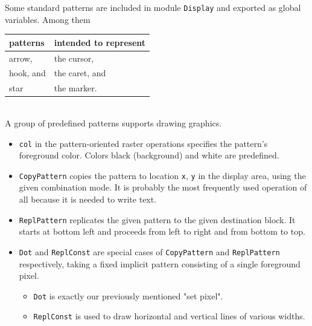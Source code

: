 Some standard patterns are included in module \verb|Display| and exported as global variables.
Among them
\begin{table}[h!]
  \centering
  \begin{tabular}{l l}
    patterns  & intended to represent \\\hline
    arrow,    & the cursor, \\
    hook, and & the caret, and \\
    star      & the marker.
  \end{tabular}
\end{table}
\\A group of predefined patterns supports drawing graphics.
\begin{itemize}
  \item \verb|col| in the pattern-oriented raster operations specifies the pattern's foreground color.
    Colors black (background) and white are predefined.
  \item \verb|CopyPattern| copies the pattern to location \verb|x|, \verb|y| in the display area,
    using the given combination mode.
    It is probably the most frequently used operation of all because it is needed to write text.
  \item \verb|ReplPattern| replicates the given pattern to the given destination block.
    It starts at bottom left and proceeds from left to right and from bottom to top.
  \item \verb|Dot| and \verb|ReplConst| are special cases of \verb|CopyPattern| and \verb|ReplPattern|
    respectively, taking a fixed implicit pattern consisting of a single foreground pixel.
    \begin{itemize}
      \item \verb|Dot| is exactly our previously mentioned "set pixel".
      \item \verb|ReplConst| is used to draw horizontal and vertical lines of various widths.
    \end{itemize}
\end{itemize}

